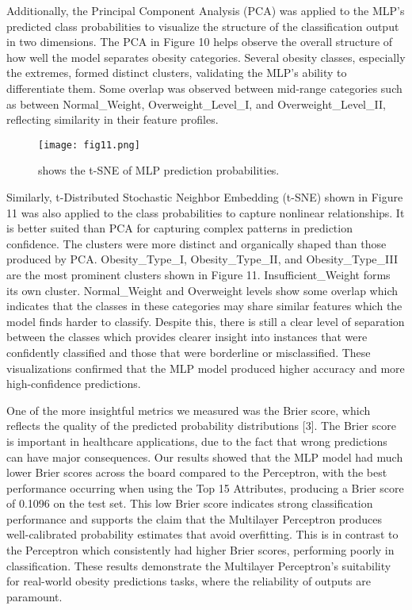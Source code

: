 \documentclass[conference]{IEEEtran}
\begin{document}
Additionally, the Principal Component Analysis (PCA) was applied to the MLP’s predicted class probabilities to visualize the structure of the classification output in two dimensions. The PCA in Figure 10 helps observe the overall structure of how well the model separates obesity categories. Several obesity classes, especially the extremes, formed distinct clusters, validating the MLP’s ability to differentiate them. Some overlap was observed between mid-range categories such as between Normal\_Weight, Overweight\_Level\_I, and Overweight\_Level\_II, reflecting similarity in their feature profiles.

\begin{figure}[htbp]
\centering
\texttt{[image: fig11.png]}
\caption{shows the t-SNE of MLP prediction probabilities.}
\label{Table 3.1}
\end{figure}

Similarly, t-Distributed Stochastic Neighbor Embedding (t-SNE) shown in Figure 11 was also applied to the class probabilities to capture nonlinear relationships. It is better suited than PCA for capturing complex patterns in prediction confidence. The clusters were more distinct and organically shaped than those produced by PCA. Obesity\_Type\_I, Obesity\_Type\_II, and Obesity\_Type\_III are the most prominent clusters shown in Figure 11. Insufficient\_Weight forms its own cluster. Normal\_Weight and Overweight levels show some overlap which indicates that the classes in these categories may share similar features which the model finds harder to classify. Despite this, there is still a clear level of separation between the classes which provides clearer insight into instances that were confidently classified and those that were borderline or misclassified. These visualizations confirmed that the MLP model produced higher accuracy and more high-confidence predictions.

One of the more insightful metrics we measured was the Brier score, which reflects the quality of the predicted probability distributions [3]. The Brier score is important in healthcare applications, due to the fact that wrong predictions can have major consequences. Our results showed that the MLP model had much lower Brier scores across the board compared to the Perceptron, with the best performance occurring when using the Top 15 Attributes, producing a Brier score of 0.1096 on the test set. This low Brier score indicates strong classification performance and supports the claim that the Multilayer Perceptron produces well-calibrated probability estimates that avoid overfitting. This is in contrast to the Perceptron which consistently had higher Brier scores, performing poorly in classification. These results demonstrate the Multilayer Perceptron’s suitability for real-world obesity predictions tasks, where the reliability of outputs are paramount.
\end{document}
